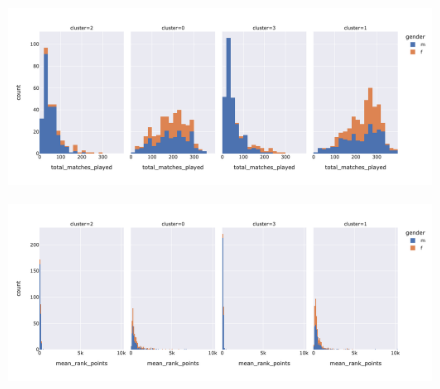 \documentclass{article}
\begin{document}
\begin{figure}
\centering
\begin{minipage}{.5\textwidth}
\centering
\includegraphics[width=\textwidth]{total_match_played_kmeans}
\label{fig:total_match_played_kmeans}
\end{minipage}%
\begin{minipage}{.5\textwidth}
\centering
\includegraphics[width=\textwidth]{mean_rank_points_kmeans}
\label{fig:mean_rank_points_kmeans}
\end{minipage}


\end{figure}
\end{document}
